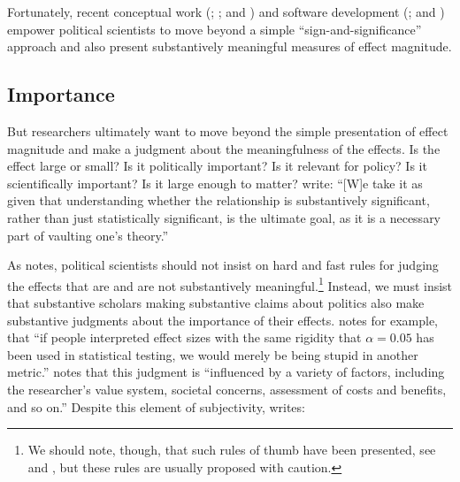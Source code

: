 \documentclass[12pt]{article}
\begin{document}

Fortunately, recent conceptual work (\citealt{KingTomzWittenberg2000}; \citealt{BerryDeMerittEsarey2010}; and \citealt{HanmerKalkan2013}) and software development (\citealt{TomzWittenbergKing2003}; and \citealt{ImaiKingLau2007}) empower political scientists to move beyond a simple ``sign-and-significance'' approach and also present substantively meaningful measures of effect magnitude.

\subsection*{Importance}

But researchers ultimately want to move beyond the simple presentation of effect magnitude and make a judgment about the meaningfulness of the effects. Is the effect large or small? Is it politically important? Is it relevant for policy? Is it scientifically important? Is it large enough to matter? \citet[p. 264]{HanmerKalkan2013} write: ``[W]e take it as given that understanding whether the relationship is substantively significant, rather than just statistically significant, is the ultimate goal, as it is a necessary part of vaulting one's theory.''

As \cite{Rainey2014} notes, political scientists should not insist on hard and fast rules for judging the effects that are and are not substantively meaningful.\footnote{We should note, though, that such rules of thumb have been presented, see \cite{Glass1976} and \cite{Cohen1992}, but these rules are usually proposed with caution.} Instead, we must insist that substantive scholars making substantive claims about politics also make substantive judgments about the importance of their effects. \citet[pp. 82-83]{Thompson2001} notes for example, that ``if people interpreted effect sizes with the same rigidity that $\alpha = 0.05$ has been used in statistical testing, we would merely be being stupid in another metric.'' \cite{Kirk1996} notes that this judgment is ``influenced by a variety of factors, including the researcher's value system, societal concerns, assessment of costs and benefits, and so on.'' Despite this element of subjectivity, \citet[p. 30]{Thompson2002} writes: 
\end{document}
